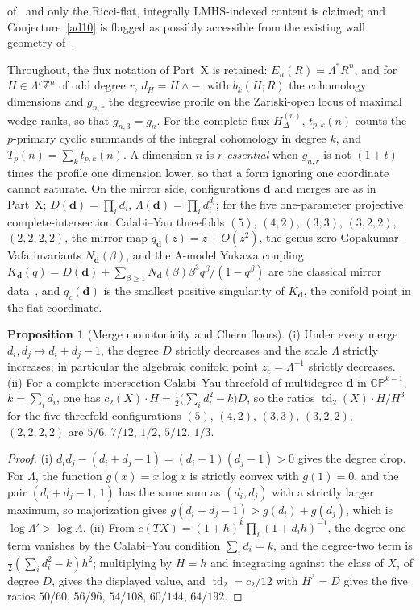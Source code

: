 \documentclass[11pt]{article}
\theoremstyle{definition}
\newcommand{\Z}{\mathbb Z}
\providecommand{\Z}{\mathbb Z}
\newtheorem{proposition}{Proposition}
\begin{document}
of~\cite{Cao26} and only the Ricci-flat, integrally LMHS-indexed content is claimed; and Conjecture~\ref{ad10} is flagged as possibly accessible from the existing wall geometry of~\cite{JM19}.

Throughout, the flux notation of Part~X is retained: $E_n(R)=\Lambda^{*}R^n$, and for $H\in\Lambda^r\Z^n$ of odd degree $r$, $d_H=H\wedge-$, with $b_k(H;R)$ the cohomology dimensions and $g_{n,r}$ the degreewise profile on the Zariski-open locus of maximal wedge ranks, so that $g_{n,3}=g_n$.  For the complete flux $H^{(n)}_\Delta$, $t_{p,k}(n)$ counts the $p$-primary cyclic summands of the integral cohomology in degree $k$, and $T_p(n)=\sum_kt_{p,k}(n)$.  A dimension $n$ is \emph{$r$-essential} when $g_{n,r}$ is not $(1+t)$ times the profile one dimension lower, so that a form ignoring one coordinate cannot saturate.  On the mirror side, configurations $\mathbf d$ and merges are as in Part~X; $D(\mathbf d)=\prod_id_i$, $\Lambda(\mathbf d)=\prod_id_i^{d_i}$; for the five one-parameter projective complete-intersection Calabi--Yau threefolds $(5)$, $(4,2)$, $(3,3)$, $(3,2,2)$, $(2,2,2,2)$, the mirror map $q_{\mathbf d}(z)=z+O(z^2)$, the genus-zero Gopakumar--Vafa invariants $N_{\mathbf d}(\beta)$, and the A-model Yukawa coupling $K_{\mathbf d}(q)=D(\mathbf d)+\sum_{\beta\ge1}N_{\mathbf d}(\beta)\beta^3q^\beta/(1-q^\beta)$ are the classical mirror data~\cite{HKTY95}, and $q_c(\mathbf d)$ is the smallest positive singularity of $K_{\mathbf d}$, the conifold point in the flat coordinate.

\begin{proposition}[Merge monotonicity and Chern floors]\label{ad:merge}
(i) Under every merge $d_i,d_j\mapsto d_i+d_j-1$, the degree $D$ strictly decreases and the scale $\Lambda$ strictly increases; in particular the algebraic conifold point $z_c=\Lambda^{-1}$ strictly decreases.  (ii) For a complete-intersection Calabi--Yau threefold of multidegree $\mathbf d$ in $\mathbb{CP}^{k-1}$, $k=\sum_id_i$, one has $c_2(X)\cdot H=\tfrac12\bigl(\sum_id_i^2-k\bigr)D$, so the ratios $\operatorname{td}_2(X)\cdot H/H^3$ for the five threefold configurations $(5)$, $(4,2)$, $(3,3)$, $(3,2,2)$, $(2,2,2,2)$ are $5/6$, $7/12$, $1/2$, $5/12$, $1/3$.
\end{proposition}

\begin{proof}
(i) $d_id_j-(d_i+d_j-1)=(d_i-1)(d_j-1)>0$ gives the degree drop.  For $\Lambda$, the function $g(x)=x\log x$ is strictly convex with $g(1)=0$, and the pair $(d_i+d_j-1,\,1)$ has the same sum as $(d_i,d_j)$ with a strictly larger maximum, so majorization gives $g(d_i+d_j-1)>g(d_i)+g(d_j)$, which is $\log\Lambda'>\log\Lambda$.  (ii) From $c(TX)=(1+h)^k\prod_i(1+d_ih)^{-1}$, the degree-one term vanishes by the Calabi--Yau condition $\sum_id_i=k$, and the degree-two term is $\tfrac12(\sum_id_i^2-k)h^2$; multiplying by $H=h$ and integrating against the class of $X$, of degree $D$, gives the displayed value, and $\operatorname{td}_2=c_2/12$ with $H^3=D$ gives the five ratios $50/60$, $56/96$, $54/108$, $60/144$, $64/192$.
\end{proof}
\end{document}
